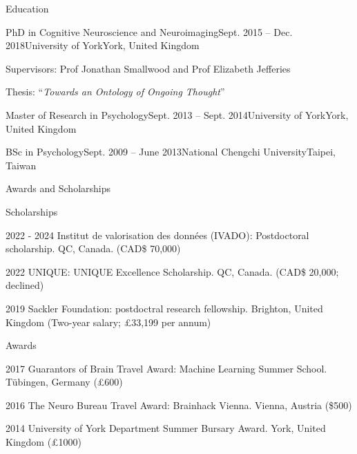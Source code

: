 \documentclass{resume} %
\begin{document}

\begin{rSection}{Education}

  \begin{rSubsection}{PhD in Cognitive Neuroscience and Neuroimaging}{Sept. 2015 -- Dec. 2018}{University of York}{York, United Kingdom}
    \item Supervisors: Prof Jonathan Smallwood and Prof Elizabeth Jefferies
    \item Thesis: ``\textit{Towards an Ontology of Ongoing Thought}''
  \end{rSubsection}

  \begin{EDUrSubsection}{Master of Research in Psychology}{Sept. 2013 -- Sept. 2014}{University of York}{York, United Kingdom}
  \end{EDUrSubsection}

  \begin{EDUrSubsection}{BSc in Psychology}{Sept. 2009 -- June 2013}{National Chengchi University}{Taipei, Taiwan}
  \end{EDUrSubsection}
\end{rSection}



\begin{rSection}{Awards and Scholarships}
  
  \begin{rSubsection}{Scholarships}{}{}{}
    \item 2022 - 2024 Institut de valorisation des données (IVADO): Postdoctoral scholarship. QC, Canada. (CAD\$ 70,000)
    \item 2022 UNIQUE: UNIQUE Excellence Scholarship. QC, Canada. (CAD\$ 20,000; declined)
    \item 2019 Sackler Foundation: postdoctral research fellowship. Brighton, United Kingdom (Two-year salary; \pounds 33,199 per annum)
  \end{rSubsection}
  
  \begin{rSubsection}{Awards}{}{}{}
    \item 2017 Guarantors of Brain Travel Award: Machine Learning Summer School. T\"{u}bingen, Germany (\pounds 600)
    \item 2016 The Neuro Bureau Travel Award: Brainhack Vienna. Vienna, Austria (\$500)
    \item 2014 University of York Department Summer Bursary Award. York, United Kingdom (\pounds 1000)
  \end{rSubsection}

\end{rSection}
\pagebreak
\end{document}
